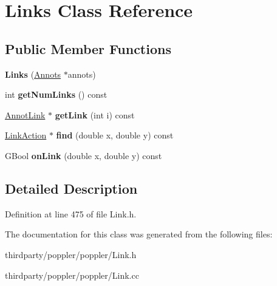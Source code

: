 \hypertarget{class_links}{}\section{Links Class Reference}
\label{class_links}
\subsection*{Public Member Functions}
\begin{DoxyCompactItemize}
\item 
\mbox{\label{class_links_acdef2367da0093055ed66e5592be8608}} 
{\bfseries Links} (\hyperlink{class_annots}{Annots} $\ast$annots)
\item 
\mbox{\label{class_links_a3e0bd94a3215e42c47211d0d8bd632d3}} 
int {\bfseries get\+Num\+Links} () const
\item 
\mbox{\label{class_links_a124da44aecfac17a1f66d9cc485351cb}} 
\hyperlink{class_annot_link}{Annot\+Link} $\ast$ {\bfseries get\+Link} (int i) const
\item 
\mbox{\label{class_links_adc8a2ce1f4bb970ef2febf67f8136244}} 
\hyperlink{class_link_action}{Link\+Action} $\ast$ {\bfseries find} (double x, double y) const
\item 
\mbox{\label{class_links_a05de489e7db31d07dbcb13d8e3ad0205}} 
G\+Bool {\bfseries on\+Link} (double x, double y) const
\end{DoxyCompactItemize}


\subsection{Detailed Description}


Definition at line 475 of file Link.\+h.



The documentation for this class was generated from the following files\+:\begin{DoxyCompactItemize}
\item 
thirdparty/poppler/poppler/Link.\+h\item 
thirdparty/poppler/poppler/Link.\+cc\end{DoxyCompactItemize}
